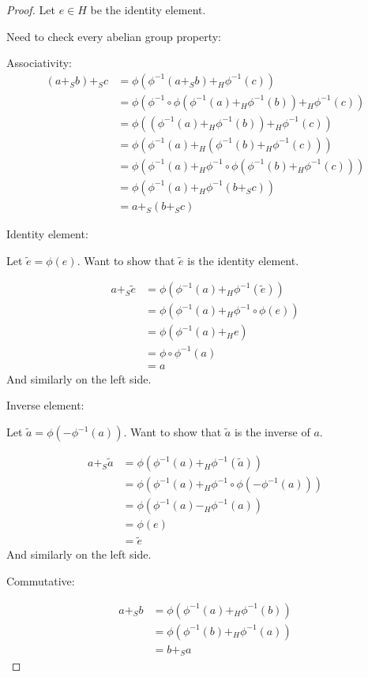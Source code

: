 \begin{proof}
    Let \( e \in H \) be the identity element.
    
    Need to check every abelian group property:

    Associativity:
    \begin{align*}
        (a +_S b) +_S c &= \phi(\phi^{-1}(a +_S b) +_H \phi^{-1}(c)) \\
        &= \phi(\phi^{-1} \circ \phi(\phi^{-1}(a) +_H \phi^{-1}(b)) +_H \phi^{-1}(c)) \\
        &= \phi((\phi^{-1}(a) +_H \phi^{-1}(b)) +_H \phi^{-1}(c)) \\
        &= \phi(\phi^{-1}(a) +_H (\phi^{-1}(b) +_H \phi^{-1}(c))) \\
        &= \phi(\phi^{-1}(a) +_H \phi^{-1} \circ \phi(\phi^{-1}(b) +_H \phi^{-1}(c))) \\
        &= \phi(\phi^{-1}(a) +_H \phi^{-1}(b +_S c)) \\
        &= a +_S (b +_S c)
    \end{align*}

    Identity element:

    Let \( \tilde{e} = \phi(e) \). Want to show that \( \tilde{e} \) is the identity element.

    \begin{align*}
        a +_S \tilde{e} &= \phi(\phi^{-1}(a) +_H \phi^{-1}(\tilde{e})) \\
        &= \phi(\phi^{-1}(a) +_H \phi^{-1} \circ \phi(e)) \\
        &= \phi(\phi^{-1}(a) +_H e) \\
        &= \phi \circ \phi^{-1}(a) \\
        &= a
    \end{align*}
    And similarly on the left side.

    Inverse element:

    Let \( \tilde{a} = \phi(-\phi^{-1}(a)) \). Want to show that \( \tilde{a} \) is the inverse of \( a \).

    \begin{align*}
        a +_S \tilde{a} &= \phi(\phi^{-1}(a) +_H \phi^{-1}(\tilde{a})) \\
        &= \phi(\phi^{-1}(a) +_H \phi^{-1} \circ \phi(-\phi^{-1}(a))) \\
        &= \phi(\phi^{-1}(a) -_H \phi^{-1}(a)) \\
        &= \phi(e) \\
        &= \tilde{e}
    \end{align*}
    And similarly on the left side.

    Commutative:

    \begin{align*}
        a +_S b &= \phi(\phi^{-1}(a) +_H \phi^{-1}(b)) \\
        &= \phi(\phi^{-1}(b) +_H \phi^{-1}(a)) \\
        &= b +_S a
    \end{align*}
\end{proof}

